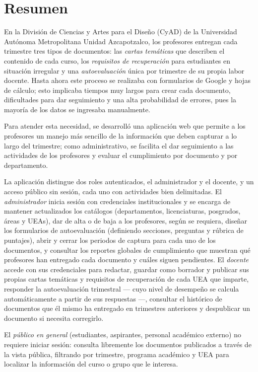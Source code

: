 \section*{Resumen}
{}
\justifying
\setlength{\parindent}{1.5em}


En la División de Ciencias y Artes para el Diseño (CyAD) de la Universidad Autónoma Metropolitana Unidad Azcapotzalco, los profesores entregan cada trimestre tres tipos de documentos: las \emph{cartas temáticas} que describen el contenido de cada curso, los \emph{requisitos de recuperación} para estudiantes en situación irregular y una \emph{autoevaluación} única por trimestre de su propia labor docente. Hasta ahora este proceso se realizaba con formularios de Google y hojas de cálculo; esto implicaba tiempos muy largos para crear cada documento, dificultades para dar seguimiento y una alta probabilidad de errores, pues la mayoría de los datos se ingresaba manualmente.

Para atender esta necesidad, se desarrolló una aplicación web que permite a los profesores un manejo más sencillo de la información que deben capturar a lo largo del trimestre; como administrativo, se facilita el dar seguimiento a las actividades de los profesores y evaluar el cumplimiento por documento y por departamento.

La aplicación distingue dos roles autenticados, el administrador y el docente, y un acceso público sin sesión, cada uno con actividades bien delimitadas. El \emph{administrador} inicia sesión con credenciales institucionales y se encarga de mantener actualizados los catálogos (departamentos, licenciaturas, posgrados, áreas y UEAs), dar de alta o de baja a los profesores, según se requiera, diseñar los formularios de autoevaluación (definiendo secciones, preguntas y rúbrica de puntajes), abrir y cerrar los periodos de captura para cada uno de los documentos, y consultar los reportes globales de cumplimiento que muestran qué profesores han entregado cada documento y cuáles siguen pendientes. El \emph{docente} accede con sus credenciales para redactar, guardar como borrador y publicar sus propias cartas temáticas y requisitos de recuperación de cada UEA que imparte, responder la autoevaluación trimestral --- cuyo nivel de desempeño se calcula automáticamente a partir de sus respuestas ---, consultar el histórico de documentos que él mismo ha entregado en trimestres anteriores y despublicar un documento si necesita corregirlo.

El \emph{público en general} (estudiantes, aspirantes, personal académico externo) no requiere iniciar sesión: consulta libremente los documentos publicados a través de la vista pública, filtrando por trimestre, programa académico y UEA para localizar la información del curso o grupo que le interesa.

